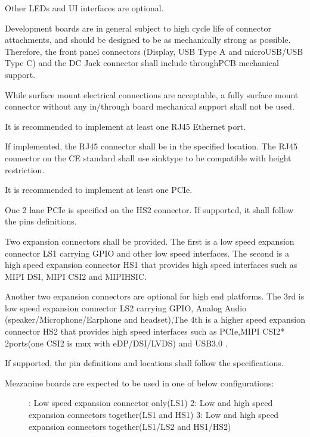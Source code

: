 \documentclass[a4paper,10pt,oneside,english]{sphinxmanual}
\begin{document}
\sphinxAtStartPar
Other LEDs and UI interfaces are optional.

\sphinxAtStartPar
{}

\sphinxAtStartPar
Development boards are in general subject to high cycle life of connector attachments, and should be designed to be as mechanically strong as possible. Therefore, the front panel connectors (Display, USB Type A and microUSB/USB Type C) and the DC Jack connector shall include through\sphinxhyphen{}PCB mechanical support.

\sphinxAtStartPar
While surface mount electrical connections are acceptable, a fully surface mount connector without any in/through board mechanical support shall not be used.

\sphinxAtStartPar
{}

\sphinxAtStartPar
It is recommended to implement at least one RJ45 Ethernet port.

\sphinxAtStartPar
If implemented, the RJ45 connector shall be in the specified location. The RJ45 connector on the  CE standard  shall use sink\sphinxhyphen{}type to be compatible with height restriction.

\sphinxAtStartPar
{}

\sphinxAtStartPar
It is recommended to implement at least one PCIe.

\sphinxAtStartPar
One  2 lane PCIe is specified on the HS2 connector. If supported, it shall follow the pins definitions.

\sphinxAtStartPar
{}

\sphinxAtStartPar
Two expansion connectors shall be provided. The first is a low speed expansion connector LS1 carrying GPIO and other low speed interfaces. The second is a high speed expansion connector HS1 that provides high speed interfaces such as MIPI DSI, MIPI CSI\sphinxhyphen{}2 and MIPI\sphinxhyphen{}HSIC.

\sphinxAtStartPar
Another two expansion connectors are optional for high end platforms. The 3rd  is low speed expansion connector LS2 carrying GPIO, Analog Audio (speaker/Microphone/Earphone and headset),The 4th is a higher speed expansion connector HS2 that provides high speed interfaces such as PCIe,MIPI CSI\sphinxhyphen{}2* 2ports(one CSI\sphinxhyphen{}2 is mux with eDP/DSI/LVDS) and USB3.0 .

\sphinxAtStartPar
If supported,  the pin definitions and locations shall follow the specifications.
\begin{description}
\item[{Mezzanine boards are expected to be used in one of below configurations:}] \leavevmode
{}: Low speed expansion connector only(LS1)
2: Low and high speed expansion connectors together(LS1 and HS1)
3: Low and high speed expansion connectors together(LS1/LS2 and HS1/HS2)

\end{description}
\end{document}
